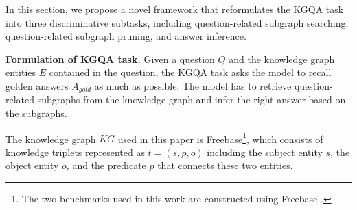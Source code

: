 \documentclass[11pt]{article}
\begin{document}

In this section, we propose a novel framework that reformulates the KGQA task into three discriminative subtasks, including question-related subgraph searching, question-related subgraph pruning, and answer inference. %

\noindent\textbf{Formulation of KGQA task.} Given a question $Q$ and the knowledge graph entities $E$ contained in the question, the KGQA task asks the model to recall golden answers $A_{gold}$ as much as possible. The model has to retrieve question-related subgraphs from the knowledge graph and infer the right answer based on the subgraphs.

The knowledge graph $KG$ used in this paper is Freebase\footnote{The two benchmarks used in this work are constructed using Freebase \cite{bollacker2008freebase}.}, which consists of knowledge triplets represented as $t=(s,p,o)$ including the subject entity $s$, the object entity $o$, and the predicate $p$ that connects these two entities.
\end{document}
